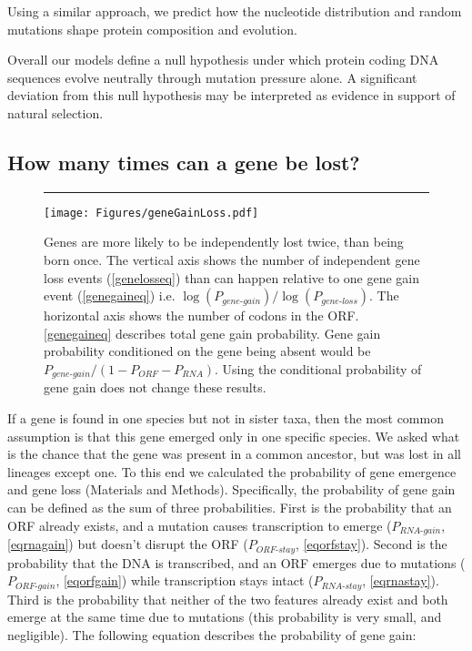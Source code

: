 \documentclass[12pt,a4paper]{article}
\begin{document}
Using a similar approach, we predict how the nucleotide distribution and random mutations shape protein composition and evolution. 

Overall our models define a null hypothesis under which protein coding DNA sequences evolve neutrally through mutation pressure alone. A significant deviation from this null hypothesis may be interpreted as evidence in support of natural selection. 

\subsection{How many times can a gene be lost?}

\begin{figure}[!b]
\hrule
\vspace{1ex}
\centering
\texttt{[image: Figures/geneGainLoss.pdf]}
\caption{Genes are more likely to be independently lost twice, than being born once. The vertical axis shows the number of independent gene loss events (\autoref{genelosseq}) than can happen relative to one gene gain event (\autoref{genegaineq}) i.e. $\log(P_\textit{gene-gain})/\log(P_\textit{gene-loss})$. The horizontal axis shows the number of codons in the ORF. \autoref{genegaineq} describes total gene gain probability. Gene gain probability conditioned on the gene being absent would be $P_\textit{gene-gain}/(1-P_\textit{ORF} - P_\textit{RNA})$. Using the conditional probability of gene gain does not change these results.}
\label{gainlossprob}
\end{figure}

If a gene is found in one species but not in sister taxa, then the most common assumption is that this gene emerged only in one specific species. We asked what is the chance that the gene was present in a common ancestor, but was lost in all lineages except one. To this end we calculated the probability of gene emergence and gene loss (Materials and Methods). Specifically, the probability of gene gain can be defined as the sum of three probabilities. First is the probability that an ORF already exists, and a mutation causes transcription to emerge ($P_\textit{RNA-gain}$, \autoref{eqrnagain}) but doesn't disrupt the ORF ($P_\textit{ORF-stay}$, \autoref{eqorfstay}). Second is the probability that the DNA is transcribed, and an ORF emerges due to mutations ($P_\textit{ORF-gain}$, \autoref{eqorfgain}) while transcription stays intact ($P_\textit{RNA-stay}$, \autoref{eqrnastay}). Third is the probability that neither of the two features already exist and both emerge at the same time due to mutations (this probability is very small, and negligible). The following equation describes the probability of gene gain:
\end{document}
